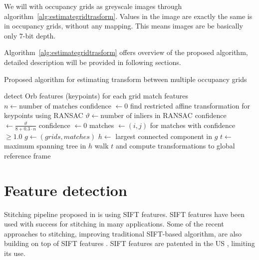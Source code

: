 We will with occupancy grids as greyscale images through algorithm~\ref{alg:estimategridtrasform}. Values in the image are exactly the same is in occupancy grids, without any mapping. This means images are be basically only $7$-bit depth.

Algorithm~\ref{alg:estimategridtrasform} offers overview of the proposed algorithm, detailed description will be provided in following sections.

\begin{algorithm}
    \caption{Proposed algorithm for estimating transform between multiple occupancy grids}
    \label{alg:estimategridtrasform}
    \begin{algorithmic}[1]
            \State detect Orb features (keypoints) for each grid
             
            	\State match features
            	\State $n \gets \text{number of matches}$
            		\State confidence $\gets 0$
            	\Else
            		\State find restricted affine transformation for keypoints using RANSAC
            		\State $\vartheta \gets \text{number of inliers in RANSAC}$
            			\State confidence $\gets \frac{\vartheta}{8 + 0.3 \cdot n}$
            		\Else
            			\State confidence $\gets 0$
            		\EndIf
            	\EndIf
            \EndFor
            \State matches $\gets (i,j)$ for matches with confidence $\ge 1.0$
            \State $g \gets (grids, matches)$
            \State $h \gets$ largest connected component in $g$
            \State $t \gets$ maximum spanning tree in $h$
            \State walk $t$ and compute transformations to global reference frame
        \EndProcedure
    \end{algorithmic}
\end{algorithm}


\section{Feature detection} %
\label{sec:feature_detection}

Stitching pipeline proposed in \cite{Brown2006} is using SIFT features. SIFT features have been used with success for stitching in many applications. Some of the recent approaches to stitching, improving traditional SIFT-based algorithm, are also building on top of SIFT features \cite{Xie2015}. SIFT features are patented in the US \cite{lowe2004method}, limiting its use.

